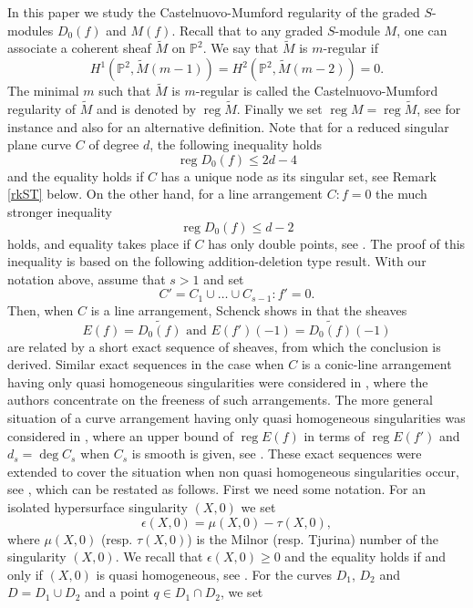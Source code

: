 \documentclass[12pt]{amsart}
\theoremstyle{plain}
\theoremstyle{definition}
\numberwithin{equation}{section}
\newcommand{\PP}{\mathbb{P}}
\newcommand{\tM}{\widetilde{M}}
\DeclareMathOperator{\reg}{reg}
\begin{document}
In this paper we study the Castelnuovo-Mumford regularity of the graded $S$-modules $D_0(f)$ and $M(f)$. Recall that to any graded $S$-module $M$, one can associate a coherent sheaf $\tM$ on $\PP^2$.
We say that $\tM$ is $m$-regular if
$$H^1(\PP^2, \tM(m-1))=H^2(\PP^2, \tM(m-2))=0.$$
The minimal $m$ such that $\tM$ is $m$-regular is called the
Castelnuovo-Mumford regularity of $\tM$ and is denoted by 
$\reg \tM$. Finally we set $\reg M= \reg \tM$, see for instance \cite{Sch0,SchT1} and also \cite[Definition 54]{Sch} for an alternative definition.
Note that for a reduced singular plane curve $C$ of degree $d$, the following inequality holds
\begin{equation}
\label{eq1}
\reg D_0(f) \leq 2d-4
\end{equation}
and the equality holds if $C$ has a unique node as its singular set,
see Remark \ref{rkST} below. On the other hand, for a line arrangement $C:f=0$ the much stronger inequality
\begin{equation}
\label{eq2}
\reg D_0(f) \leq d-2
\end{equation}
holds, and equality takes place if $C$ has only double points, see 
\cite[Corollary 3.5]{Sch0}. The proof of this inequality is based on the following addition-deletion type result. With our notation above, assume that $s>1$ and set 
$$C'=C_1 \cup \ldots \cup C_{s-1}: f'=0.$$
Then, when $C$ is a line arrangement, Schenck shows in \cite{Sch0} that the sheaves 
$$E(f)=\widetilde{ D_0(f)} \text{ and } E(f')(-1)=\widetilde{ D_0(f)}(-1)$$
are related by a short exact sequence of sheaves, from which the conclusion is derived. Similar exact sequences in the case when $C$ is a conic-line arrangement having only quasi homogeneous singularities were considered in \cite{SchT1}, where the authors concentrate on the freeness of such arrangements. The more general situation of a curve arrangement having only quasi homogeneous singularities was considered in \cite{STY}, where an upper bound of $\reg E(f)$ in terms of
$\reg E(f')$ and $d_s=\deg C_s$ when $C_s$ is smooth is given, see \cite[Lemma 3.6]{STY}.
These exact sequences were extended to cover the situation when non 
quasi homogeneous singularities occur, see \cite[Theorem 2.3]{POG}, which can be restated as follows.
First we need some notation. For an isolated hypersurface singularity $(X,0)$ we set
$$\epsilon(X,0)=\mu(X,0)-\tau(X,0),$$
where $\mu(X,0)$ (resp. $\tau(X,0)$) is the Milnor (resp. Tjurina) number 
of the singularity $(X,0)$. We recall that $\epsilon(X,0) \geq 0$ and the equality holds if and only if $(X,0)$ is quasi homogeneous, see \cite{KS0}. For the curves $D_1$, $ D_2$ and $D=D_1 \cup D_2$ and a point $q \in D_1 \cap D_2$, we set
\end{document}
